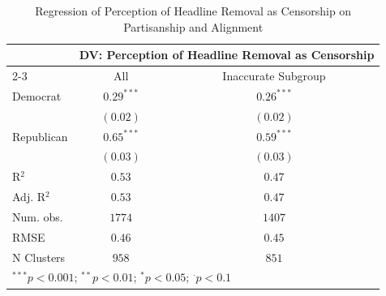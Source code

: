 
\begin{table}[!htpb]
\caption{Regression of Perception of Headline Removal as Censorship on Partisanship and Alignment}
\begin{center}
\begin{tabular}{l c c}
\hline
 & \multicolumn{2}{c}{DV: Perception of Headline Removal as Censorship} \\
\cline{2-3}
 & All & Inaccurate Subgroup \\
\hline
Democrat   & $0.29^{***}$ & $0.26^{***}$ \\
           & $(0.02)$     & $(0.02)$     \\
Republican & $0.65^{***}$ & $0.59^{***}$ \\
           & $(0.03)$     & $(0.03)$     \\
\hline
R$^2$      & $0.53$       & $0.47$       \\
Adj. R$^2$ & $0.53$       & $0.47$       \\
Num. obs.  & $1774$       & $1407$       \\
RMSE       & $0.46$       & $0.45$       \\
N Clusters & $958$        & $851$        \\
\hline
\multicolumn{3}{l}{\scriptsize{$^{***}p<0.001$; $^{**}p<0.01$; $^{*}p<0.05$; $^{\cdot}p<0.1$}}
\end{tabular}
\label{tab:withoutinteraction-mainspecification-censorship-weighted-clusteredses-ld}
\end{center}
\end{table}
